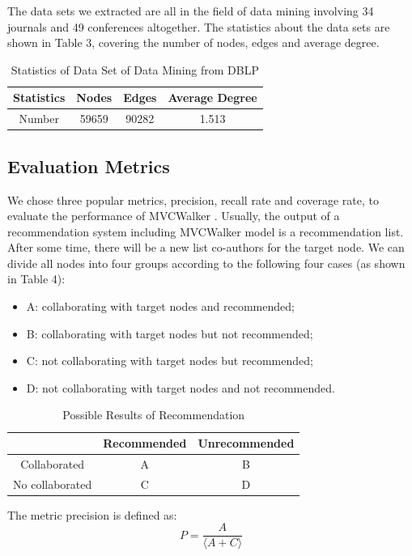 \documentclass[10pt,journal,compsoc]{IEEEtran}
\begin{document}
The data sets we extracted are all in the field of data mining involving 34 journals and 49 conferences altogether. The statistics about the data sets are shown in Table 3, covering the number of nodes, edges and average degree.
\begin{table}
\renewcommand{\arraystretch}{1.2}
\centering
\caption{Statistics of Data Set of Data Mining from DBLP}
\begin{tabular}{|c|c|c|c|} \hline
Statistics &Nodes&Edges&Average Degree\\ \hline
Number & 59659 &90282 &1.513 \\
\hline\end{tabular}
\end{table}

\subsection{Evaluation Metrics}

We chose three popular metrics, precision, recall rate and coverage rate, to evaluate the performance of MVCWalker \cite{Fouss:web, Shani:recommender}. Usually, the output of a recommendation system including MVCWalker model is a recommendation list. After some time, there will be a new list co-authors for the target node. We can divide all nodes into four groups according to the following four cases (as shown in Table 4):
\begin{itemize}
\item A: collaborating with target nodes and recommended;
\item B: collaborating with target nodes but not recommended;
\item C: not collaborating with target nodes but recommended;
\item D: not collaborating with target nodes and not recommended.
\end{itemize}
\begin{table}
\renewcommand{\arraystretch}{1.2}
\centering
\caption{Possible Results of Recommendation}
\begin{tabular}{ |c|c|c|} \hline
                 &Recommended &Unrecommended\\ \hline
Collaborated    & A          & B\\ \hline
No collaborated & C          & D\\
\hline\end{tabular}
\end{table}

The metric precision is defined as:
\begin{equation}
P=\frac {A}{\langle A+C \rangle}
\end{equation}
\end{document}
